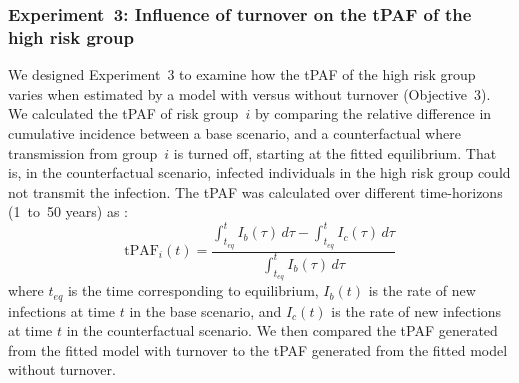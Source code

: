 \subsubsection{Experiment~3: Influence of turnover on the tPAF of the high risk group}
\label{sss:exp-tpaf}
We designed Experiment~3 to examine how the tPAF of the
high risk group varies when estimated
by a model with versus without turnover (Objective~3).
We calculated the tPAF of risk group~$i$ by comparing
the relative difference in cumulative incidence between
a base scenario, and a counterfactual where transmission from group~$i$ is turned off,
starting at the fitted equilibrium.
That is, in the counterfactual scenario,
infected individuals in the high risk group could not transmit the infection.
The tPAF was calculated over different time-horizons (1~to~50 years) as
\citep{Mishra2014}:
\begin{equation}
\textrm{tPAF}_i(t) =
  \frac{\displaystyle\int_{t_{eq}}^{t} I_b(\tau) \, d\tau -
        \displaystyle\int_{t_{eq}}^{t} I_c(\tau) \, d\tau}
       {\displaystyle\int_{t_{eq}}^{t} I_b(\tau) \, d\tau}
\end{equation}
where $t_{eq}$ is the time corresponding to equilibrium,
$I_b(t)$ is the rate of new infections at time $t$ in the base scenario,
and $I_c(t)$ is the rate of new infections at time $t$ in the counterfactual scenario.
We then compared the tPAF generated from the fitted model with turnover
to the tPAF generated from the fitted model without turnover.
